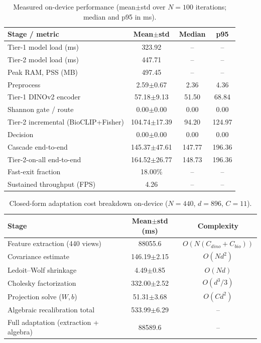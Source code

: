 \documentclass[preprint,12pt]{elsarticle}
\begin{document}
\begin{table}[htbp]
\caption{Measured on-device performance (mean$\pm$std over $N=100$ iterations; median and p95 in ms).}
\label{tab:device_perf}
\centering

\footnotesize
\begin{tabular}{lccc}
\toprule
Stage / metric & Mean$\pm$std & Median & p95 \\
\midrule
Tier-1 model load (ms) & 323.92 & -- & -- \\
Tier-2 model load (ms) & 447.71 & -- & -- \\
Peak RAM, PSS (MB) & 497.45 & -- & -- \\
\midrule
Preprocess & 2.59$\pm$0.67 & 2.36 & 4.36 \\
Tier-1 DINOv2 encoder & 57.18$\pm$9.13 & 51.50 & 68.84 \\
Shannon gate / route & 0.00$\pm$0.00 & 0.00 & 0.00 \\
Tier-2 incremental (BioCLIP+Fisher) & 104.74$\pm$17.39 & 94.20 & 124.97 \\
Decision & 0.00$\pm$0.00 & 0.00 & 0.00 \\
Cascade end-to-end & 145.37$\pm$47.61 & 147.77 & 196.36 \\
Tier-2-on-all end-to-end & 164.52$\pm$26.77 & 148.73 & 196.36 \\
\midrule
Fast-exit fraction & 18.00\% & -- & -- \\
Sustained throughput (FPS) & 4.26 & -- & -- \\
\bottomrule
\end{tabular}
\end{table}

\begin{table}[htbp]
\caption{Closed-form adaptation cost breakdown on-device ($N=440$, $d=896$, $C=11$).}
\label{tab:adaptation_breakdown}
\centering

\footnotesize
\begin{tabular}{lcc}
\toprule
Stage & Mean$\pm$std (ms) & Complexity \\
\midrule
Feature extraction (440 views) & 88055.6 & $O(N(C_{dino}+C_{bio}))$ \\
Covariance estimate & 146.19$\pm$2.15 & $O(Nd^2)$ \\
Ledoit--Wolf shrinkage & 4.49$\pm$0.85 & $O(Nd)$ \\
Cholesky factorization & 332.00$\pm$2.52 & $O(d^3/3)$ \\
Projection solve ($W,b$) & 51.31$\pm$3.68 & $O(Cd^2)$ \\
\midrule
Algebraic recalibration total & 533.99$\pm$6.29 & -- \\
Full adaptation (extraction + algebra) & 88589.6 & -- \\
\bottomrule
\end{tabular}
\end{table}
\end{document}
